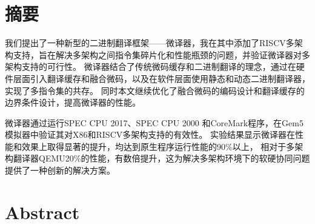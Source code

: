 \maketitle%
\MAKETITLE%
\makedeclaration%
\intobmk\chapter*{摘\quad 要}%
\setcounter{page}{1}%

我们提出了一种新型的二进制翻译框架——微译器，我在其中添加了RISCV多架构支持，旨在解决多架构之间指令集碎片化和性能瓶颈的问题，并验证微译器对多架构支持的可行性。
微译器结合了传统微码缓存和二进制翻译的理念，通过在硬件层面引入翻译缓存和融合微码，以及在软件层面使用静态和动态二进制翻译器，实现了多指令集的共存。
同时本文继续优化了融合微码的编码设计和翻译缓存的边界条件设计，提高微译器的性能。

微译器通过运行SPEC CPU 2017、SPEC CPU 2000 和CoreMark程序，在Gem5模拟器中验证其对X86和RISCV多架构支持的有效性。
实验结果显示微译器在性能和效果上取得显著的提升，均达到原生程序运行性能的90\%以上，
相对于多架构翻译器QEMU20\%的性能，有数倍提升，这为解决多架构环境下的软硬协同问题提供了一种创新的解决方案。

\intobmk\chapter*{Abstract}%


